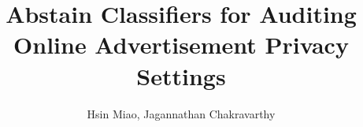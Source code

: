 \documentclass[12pt, journal]{IEEEtran}
\begin{document}
%
\title{Abstain Classifiers for Auditing Online Advertisement Privacy Settings}
%
%
%

\author{ Hsin Miao, Jagannathan Chakravarthy   
        }%
% 
%



% 




\end{document}
